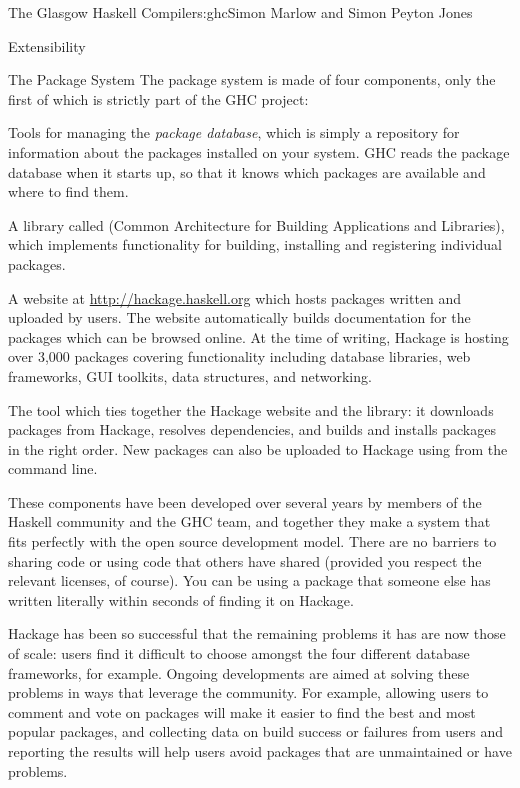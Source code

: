 \begin{aosachapter}{The Glasgow Haskell Compiler}{s:ghc}{Simon Marlow and Simon Peyton Jones}
\begin{aosasect1}{Extensibility}
\begin{aosasect2}{The Package System}
The package system is made of four components, only the first of which
is strictly part of the GHC project:

\begin{aosaitemize}

\item Tools for managing the \emph{package database}, which is simply
  a repository for information about the packages installed on your
  system.  GHC reads the package database when it starts up, so that
  it knows which packages are available and where to find them.

\item A library called  (Common Architecture for Building
  Applications and Libraries), which implements functionality for
  building, installing and registering individual packages.

\item A website at \url{http://hackage.haskell.org} which hosts
  packages written and uploaded by users.  The website automatically
  builds documentation for the packages which can be browsed online.
  At the time of writing, Hackage is hosting over 3,000 packages
  covering functionality including database libraries, web frameworks,
  GUI toolkits, data structures, and networking.

\item The  tool which ties together the Hackage website
  and the  library: it downloads packages from Hackage,
  resolves dependencies, and builds and installs packages in the right
  order.  New packages can also be uploaded to Hackage using
   from the command line.

\end{aosaitemize}

These components have been developed over several years by members of
the Haskell community and the GHC team, and together they make a
system that fits perfectly with the open source development model.
There are no barriers to sharing code or using code that others have
shared (provided you respect the relevant licenses, of course).  You
can be using a package that someone else has written literally within
seconds of finding it on Hackage.

Hackage has been so successful that the remaining problems it has are
now those of scale: users find it difficult to choose amongst the four
different database frameworks, for example.  Ongoing developments are
aimed at solving these problems in ways that leverage the community.
For example, allowing users to comment and vote on packages will make
it easier to find the best and most popular packages, and collecting
data on build success or failures from users and reporting the results
will help users avoid packages that are unmaintained or have problems.


\end{aosasect2}
\end{aosasect1}
\end{aosachapter}
